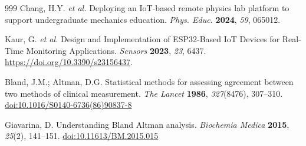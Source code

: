 \documentclass[journal,article,submit,pdftex]{Definitions/mdpi}
\begin{document}
\begin{thebibliography}{999}
Chang, H.Y. \textit{et al.}
Deploying an IoT-based remote physics lab platform to support undergraduate mechanics education.
\textit{Phys. Educ.} \textbf{2024}, \textit{59}, 065012.

Kaur, G. \textit{et al.}
Design and Implementation of ESP32-Based IoT Devices for Real-Time Monitoring Applications.
\textit{Sensors} \textbf{2023}, \textit{23}, 6437.
\href{https://doi.org/10.3390/s23156437}{https://doi.org/10.3390/s23156437}.


Bland, J.M.; Altman, D.G.
Statistical methods for assessing agreement between two methods of clinical measurement.
\textit{The Lancet} \textbf{1986}, \textit{327}(8476), 307--310.
\href{https://doi.org/10.1016/S0140-6736(86)90837-8}{doi:10.1016/S0140-6736(86)90837-8}

Giavarina, D.
Understanding Bland Altman analysis.
\textit{Biochemia Medica} \textbf{2015}, \textit{25}(2), 141--151.
\href{https://doi.org/10.11613/BM.2015.015}{doi:10.11613/BM.2015.015}

\end{thebibliography}
\end{document}
